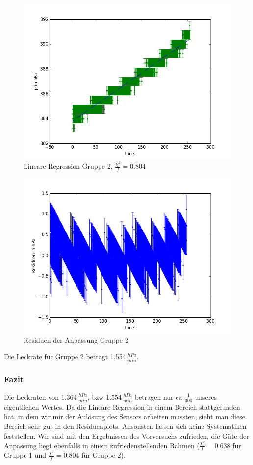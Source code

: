 \documentclass[12pt,a4paper]{article}
\begin{document}
\begin{figure}[H]
\centering
\includegraphics[scale=0.5]{Bilder/dichtigkeit__EL.png}
\caption{Lineare Regression Gruppe 2, $\frac{\chi^2}{f}=0.804$}
\end{figure}

\begin{figure}[H]
\centering
\includegraphics[scale=0.5]{Bilder/residuen_dichtigkeit_EL.png}
\caption{Residuen der Anpassung Gruppe 2}
\end{figure}

Die Leckrate für Gruppe 2 beträgt 1.554$\,\frac{hPa}{min}$.

\subsubsection{Fazit}
Die Leckraten von 1.364$\,\frac{hPa}{min}$, bzw 1.554$\,\frac{hPa}{min}$ betragen nur ca $\frac{1}{300}$ unseres eigentlichen Wertes. Da die Lineare Regression in einem Bereich stattgefunden hat, in dem wir mir der Aulösung des Sensors arbeiten mussten, sieht man diese Bereich sehr gut in den Residuenplots. Ansonsten lassen sich keine Systematiken feststellen. Wir sind mit den Ergebnissen des Vorversuchs zufrieden, die Güte der Anpassung liegt ebenfalls in einem zufriedenstellenden Rahmen ($\frac{\chi^2}{f}=0.638$ für Gruppe 1 und $\frac{\chi^2}{f}=0.804$ für Gruppe 2).
\newpage
\end{document}
